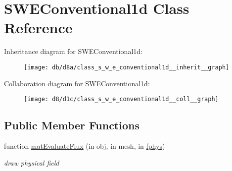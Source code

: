 \hypertarget{class_s_w_e_conventional1d}{}\section{S\+W\+E\+Conventional1d Class Reference}
\label{class_s_w_e_conventional1d}


Inheritance diagram for S\+W\+E\+Conventional1d\+:
\nopagebreak
\begin{figure}[H]
\begin{center}
\leavevmode
\texttt{[image: db/d8a/class\_s\_w\_e\_conventional1d\_\_inherit\_\_graph]}
\end{center}
\end{figure}


Collaboration diagram for S\+W\+E\+Conventional1d\+:
\nopagebreak
\begin{figure}[H]
\begin{center}
\leavevmode
\texttt{[image: d8/d1c/class\_s\_w\_e\_conventional1d\_\_coll\_\_graph]}
\end{center}
\end{figure}
\subsection*{Public Member Functions}
\begin{DoxyCompactItemize}
\item 
function \hyperlink{class_s_w_e_conventional1d_a87382cdf6291a3bd0a63ed2f096bbbeb}{mat\+Evaluate\+Flux} (in obj, in mesh, in \hyperlink{class_ndg_phys_a6b25724fc9474d32018439009072f0a9}{fphys})
\begin{DoxyCompactList}\small\item\em draw physical field \end{DoxyCompactList}\end{DoxyCompactItemize}
